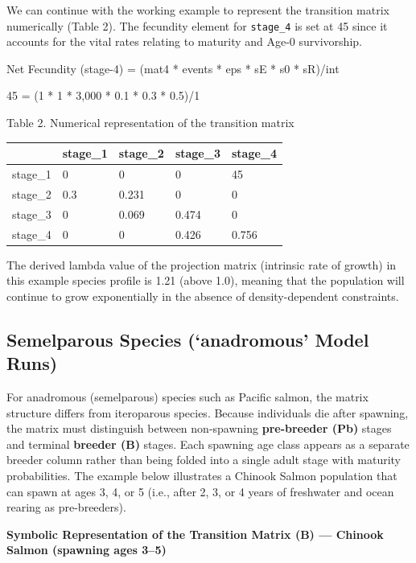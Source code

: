 \documentclass[
  letterpaper,
  DIV=11,
  numbers=noendperiod]{scrreprt}
\begin{document}
We can continue with the working example to represent the transition
matrix numerically (Table 2). The fecundity element for
\texttt{stage\_4} is set at 45 since it accounts for the vital rates
relating to maturity and Age-0 survivorship.

Net Fecundity (stage-4) = (mat4 * events * eps * sE * s0 * sR)/int

45 = (1 * 1 * 3,000 * 0.1 * 0.3 * 0.5)/1

\label{07_life_cycle_model-07_life_cycle_model-07_life_cycle_model-07_life_cycle_model-07_life_cycle_model-tbl:numerical-transition-matrix}
Table 2. Numerical representation of the transition matrix

\begin{longtable}[]{@{}lllll@{}}
\toprule\noalign{}
& stage\_1 & stage\_2 & stage\_3 & stage\_4 \\
\midrule\noalign{}
\endhead
\bottomrule\noalign{}
\endlastfoot
stage\_1 & 0 & 0 & 0 & 45 \\
stage\_2 & 0.3 & 0.231 & 0 & 0 \\
stage\_3 & 0 & 0.069 & 0.474 & 0 \\
stage\_4 & 0 & 0 & 0.426 & 0.756 \\
\end{longtable}

The derived lambda value of the projection matrix (intrinsic rate of
growth) in this example species profile is 1.21 (above 1.0), meaning
that the population will continue to grow exponentially in the absence
of density-dependent constraints.

\subsection{Semelparous Species (`anadromous' Model
Runs)}\label{semelparous-species-anadromous-model-runs}

For anadromous (semelparous) species such as Pacific salmon, the matrix
structure differs from iteroparous species. Because individuals die
after spawning, the matrix must distinguish between non-spawning
\textbf{pre-breeder (Pb)} stages and terminal \textbf{breeder (B)}
stages. Each spawning age class appears as a separate breeder column
rather than being folded into a single adult stage with maturity
probabilities. The example below illustrates a Chinook Salmon population
that can spawn at ages 3, 4, or 5 (i.e., after 2, 3, or 4 years of
freshwater and ocean rearing as pre-breeders).

\textbf{Symbolic Representation of the Transition Matrix (B) --- Chinook
Salmon (spawning ages 3--5)}
\end{document}
